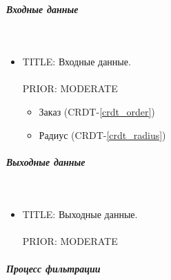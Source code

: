         \subparagraph{Входные данные} \mbox{} \\ \label{driver_filters_taxi_service_input_data}

          \begin{itemize}

            \item{

              TITLE: Входные данные.\\
              \\
              PRIOR: MODERATE\\

            }

            \begin{itemize}
              \item Заказ (CRDT-\ref{crdt_order})
              \item Радиус (CRDT-\ref{crdt_radius})
            \end{itemize}

          \end{itemize}

        \subparagraph{Выходные данные} \mbox{} \\

          \begin{itemize}

            \item{

              TITLE: Выходные данные.\\
              \\
              PRIOR: MODERATE\\

            }

          \end{itemize}

        \subparagraph{Процесс фильтрации} \mbox{} \\

